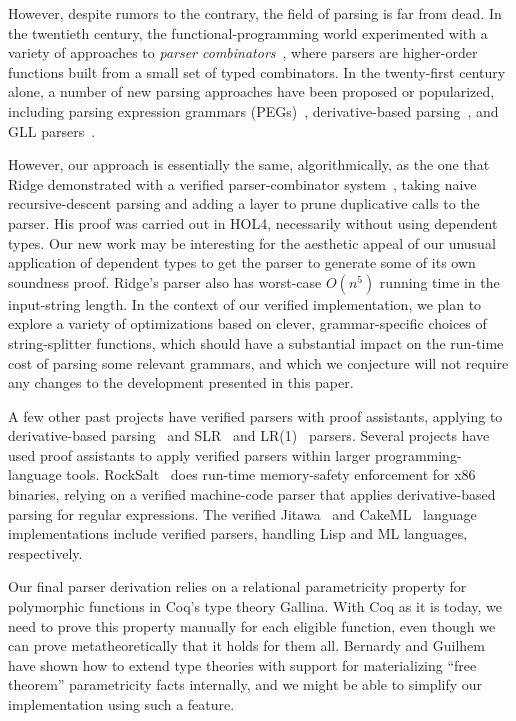   
    However, despite rumors to the contrary, the field of parsing is far from dead.  In the twentieth century, the functional-programming world experimented with a variety of approaches to \emph{parser combinators}~\cite{pcomb}, where parsers are higher-order functions built from a small set of typed combinators.  In the twenty-first century alone, a number of new parsing approaches have been proposed or popularized, including parsing expression grammars (PEGs)~\cite{PEG}, derivative-based parsing~\cite{Derivs}, and GLL parsers~\cite{GLL}.

  However, our approach is essentially the same, algorithmically, as the one that Ridge demonstrated with a verified parser-combinator system~\cite{Ridge}, taking naive recursive-descent parsing and adding a layer to prune duplicative calls to the parser.  His proof was carried out in HOL4, necessarily without using dependent types.  Our new work may be interesting for the aesthetic appeal of our unusual application of dependent types to get the parser to generate some of its own soundness proof.  Ridge's parser also has worst-case $O(n^5)$ running time in the input-string length.  In the context of our verified implementation, we plan to explore a variety of optimizations based on clever, grammar-specific choices of string-splitter functions, which should have a substantial impact on the run-time cost of parsing some relevant grammars, and which we conjecture will not require any changes to the development presented in this paper.

  A few other past projects have verified parsers with proof assistants, applying to derivative-based parsing~\cite{DerivsCoq} and SLR~\cite{SLR} and LR(1)~\cite{LR1} parsers.  Several projects have used proof assistants to apply verified parsers within larger programming-language tools.  RockSalt~\cite{RockSalt} does run-time memory-safety enforcement for x86 binaries, relying on a verified machine-code parser that applies derivative-based parsing for regular expressions.  The verified Jitawa~\cite{Jitawa} and CakeML~\cite{CakeML} language implementations include verified parsers, handling Lisp and ML languages, respectively.

  Our final parser derivation relies on a relational parametricity property for polymorphic functions in Coq's type theory Gallina.  With Coq as it is today, we need to prove this property manually for each eligible function, even though we can prove metatheoretically that it holds for them all.  Bernardy and Guilhem~\cite{InColor} have shown how to extend type theories with support for materializing ``free theorem'' parametricity facts internally, and we might be able to simplify our implementation using such a feature.

